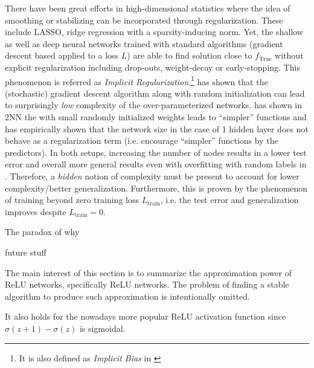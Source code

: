There have been great efforts in high-dimensional statistics where the idea
of smoothing or stabilizing can be incorporated through regularization. These
include LASSO, ridge regression with a sparsity-inducing norm. Yet, the shallow
as well as deep neural networks \cite{neyshaburSearchRealInductive2015,
maennelGradientDescentQuantizes2018, liLearningOverparameterizedNeural2019,
kuboImplicitRegularizationOverparameterized2019,
neyshaburImplicitRegularizationDeep2017} trained with standard algorithms
(gradient descent based applied to a loss $L$) are able to find solution close
to $f_{\text{True}}$ without explicit regularization including drop-outs,
weight-decay or early-stopping. This phenomenon is referred as \textit{Implicit
Regularization}.\footnote{ It is also defined as \textit{Implicit Bias} in
\cite{soudryImplicitBiasGradient2022} }
\cite{kuboImplicitRegularizationOverparameterized2019} has shown that the
(stochastic) gradient descent algorithm along with random initialization can
lead to surprisingly \textit{low} complexity of the over-parameterized networks.
\cite{maennelGradientDescentQuantizes2018} has shown in 2NN the with small
randomly initialized weights leads to ``simpler'' functions and
\cite{maennelGradientDescentQuantizes2018, neyshaburSearchRealInductive2015} has
empirically shown that the network size in the case of 1 hidden layer does not
behave as a regularization term (i.e. encourage ``simpler'' functions by the
predictors). In both setups, increasing the number of nodes results in a lower
test error and overall more general results even with overfitting with random
labels in \cite{neyshaburSearchRealInductive2015}. Therefore, a \textit{hidden}
notion of complexity must be present to account for lower complexity/better
generalization. Furthermore, this is proven by the phenomenon of training beyond
zero training loss \TOCITE $L_{\text{train}}$, i.e. the test error and
generalization improves despite $L_{\text{train}} = 0$.

The paradox of why 

future stuff

The main interest of this section is to summarize the approximation power of
ReLU networks, specifically ReLU networks. The problem of finding a stable
algorithm to produce such approximation is intentionally omitted.




It also holds for the nowadays more popular ReLU activation function since
$\sigma(z+1) - \sigma(z)$ is sigmoidal.




